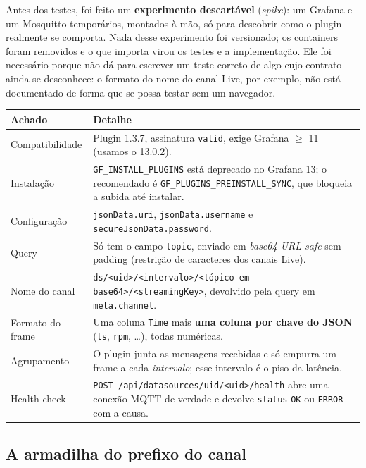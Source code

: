 \documentclass[11pt,a4paper]{article}
\begin{document}
Antes dos testes, foi feito um \textbf{experimento descartável} (\emph{spike}): um Grafana e um Mosquitto temporários, montados à mão, só para descobrir como o plugin realmente se comporta. Nada desse experimento foi versionado; os containers foram removidos e o que importa virou os testes e a implementação. Ele foi necessário porque não dá para escrever um teste correto de algo cujo contrato ainda se desconhece: o formato do nome do canal Live, por exemplo, não está documentado de forma que se possa testar sem um navegador.

\begin{center}
\begin{tabularx}{\textwidth}{lX}
\toprule
\textbf{Achado} & \textbf{Detalhe} \\
\midrule
Compatibilidade & Plugin 1.3.7, assinatura \texttt{valid}, exige Grafana $\geq$ 11 (usamos o 13.0.2). \\
Instalação & \texttt{GF\_INSTALL\_PLUGINS} está deprecado no Grafana 13; o recomendado é \texttt{GF\_PLUGINS\_PREINSTALL\_SYNC}, que bloqueia a subida até instalar. \\
Configuração & \texttt{jsonData.uri}, \texttt{jsonData.username} e \texttt{secureJsonData.password}. \\
Query & Só tem o campo \texttt{topic}, enviado em \emph{base64 URL-safe} sem padding (restrição de caracteres dos canais Live). \\
Nome do canal & \texttt{ds/<uid>/<intervalo>/<tópico em base64>/<streamingKey>}, devolvido pela query em \texttt{meta.channel}. \\
Formato do frame & Uma coluna \texttt{Time} mais \textbf{uma coluna por chave do JSON} (\texttt{ts}, \texttt{rpm}, \dots), todas numéricas. \\
Agrupamento & O plugin junta as mensagens recebidas e só empurra um frame a cada \emph{intervalo}; esse intervalo é o piso da latência. \\
Health check & \texttt{POST /api/datasources/uid/<uid>/health} abre uma conexão MQTT de verdade e devolve \texttt{status} \texttt{OK} ou \texttt{ERROR} com a causa. \\
\bottomrule
\end{tabularx}
\end{center}

\subsection{A armadilha do prefixo do canal}
\end{document}
